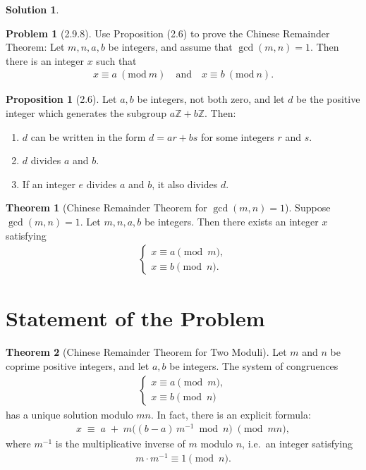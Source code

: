 \documentclass[12pt]{article}
\theoremstyle{definition} %
\newtheorem{solution}{Solution}
\newtheorem{proposition}{Proposition}
\newtheorem{problem}{Problem}
\newtheorem{theorem}{Theorem}
\theoremstyle{plain} %
\begin{document}
\begin{solution}
  
\begin{problem}[2.9.8]
Use Proposition (2.6) to prove the Chinese Remainder Theorem: Let $m,n,a,b$ be integers, and assume that $\gcd(m,n) = 1$. Then there is an integer $x$ such that 
\begin{align}
x \equiv a \ (\mathrm{mod}\ m)
\quad \text{and} \quad
x \equiv b \ (\mathrm{mod}\ n).
\end{align}
\end{problem}

\begin{proposition}[2.6]
Let $a,b$ be integers, not both zero, and let $d$ be the positive integer which generates the subgroup $a\mathbb{Z} + b\mathbb{Z}$. Then:
\begin{enumerate}
\item $d$ can be written in the form $d = ar + bs$ for some integers $r$ and $s$.
\item $d$ divides $a$ and $b$.
\item If an integer $e$ divides $a$ and $b$, it also divides $d$.
\end{enumerate}
\end{proposition}

\begin{theorem}[Chinese Remainder Theorem for $\gcd(m,n) = 1$]
Suppose $\gcd(m,n) = 1$. Let $m,n,a,b$ be integers. Then there exists an integer $x$ satisfying
\begin{align}
\begin{cases}
x \equiv a \pmod{m},\\[5pt]
x \equiv b \pmod{n}.
\end{cases}
\end{align}
\end{theorem}


\section*{Statement of the Problem}

\begin{theorem}[Chinese Remainder Theorem for Two Moduli]
Let $m$ and $n$ be coprime positive integers, and let $a,b$ be integers. The system of congruences
\begin{align}
\begin{cases}
x \equiv a \pmod{m}, \\[6pt]
x \equiv b \pmod{n}
\end{cases}
\end{align}
has a unique solution modulo $mn$. In fact, there is an explicit formula:
\begin{align}
x \;\equiv\; a \;+\; m\bigl((b - a)\,m^{-1} \bmod n\bigr)
\;\pmod{mn},
\end{align}
where $m^{-1}$ is the multiplicative inverse of $m$ modulo $n$, i.e.\ an integer satisfying
\begin{align}
m \cdot m^{-1} \equiv 1 \pmod{n}.
\end{align}
\end{theorem}


\end{solution}
\end{document}
